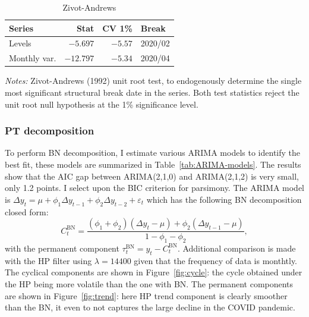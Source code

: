 \documentclass[12pt]{article}
\begin{document}
\begin{table}[H]
\centering
\begin{threeparttable}
\caption{Zivot-Andrews }\label{tab:Zivot-Andrews}
\begin{tabular}{lrrl}
\hline
\textbf{Series} & \textbf{Stat} & \textbf{CV 1\%} & \textbf{Break} \\
\hline
Levels       & $-5.697$ & $-5.57$ & 2020/02 \\
Monthly var. & $-12.797$ & $-5.34$ & 2020/04 \\
\hline
\end{tabular}
\begin{tablenotes}
    \small
    \item \textit{Notes:} Zivot-Andrews (1992) unit root test, to endogenously determine the single most significant structural break date in the series. Both test statistics reject the unit root null hypothesis at the 1\% significance level. %
\end{tablenotes}
\end{threeparttable}
\end{table}

\subsubsection*{PT decomposition}

To perform BN decomposition, I estimate various ARIMA models to identify the best fit, these models are summarized in Table~\ref{tab:ARIMA-models}. The results show that the AIC gap between ARIMA(2,1,0) and ARIMA(2,1,2) is very small, only 1.2 points. I select upon the BIC criterion for parsimony. The ARIMA model is $\Delta y_t = \mu + \phi_1\Delta y_{t-1} + \phi_2\Delta y_{t-2} + \varepsilon_t$
which has the following BN decomposition closed form:
\begin{equation}\label{eq:bn_cycle}
  C_t^{\mathrm{BN}}
  = \frac{(\phi_1+\phi_2)(\Delta y_t - \mu)
          + \phi_2(\Delta y_{t-1}-\mu)}
         {1 - \phi_1 - \phi_2},
\end{equation}
with the permanent component $\tau_t^{\mathrm{BN}} = y_t - C_t^{\mathrm{BN}}$. Additional comparison is made with the HP filter using $\lambda = 14400$ given that the frequency of data is monthtly. The cyclical components are shown in Figure~\ref{fig:cycle}: the cycle obtained under the HP being more volatile than the one with BN. The permanent components are shown in Figure~\ref{fig:trend}: here HP trend component is clearly smoother than the BN, it even to not captures the large decline in the COVID pandemic. 
\end{document}
